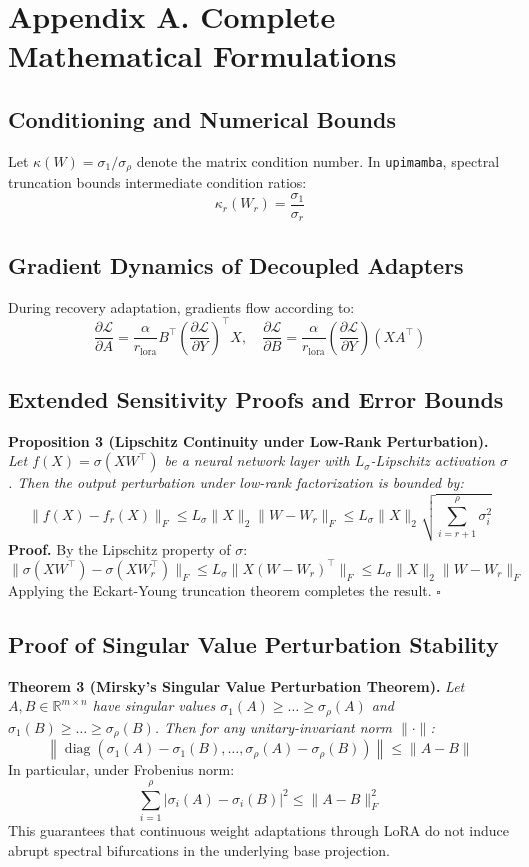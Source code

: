 \section*{Appendix A. Complete Mathematical Formulations}

\subsection*{Conditioning and Numerical Bounds}
Let $\kappa(W) = \sigma_1 / \sigma_\rho$ denote the matrix condition number. In \texttt{upimamba}, spectral truncation bounds intermediate condition ratios:
\[
\kappa_r(W_r) = \frac{\sigma_1}{\sigma_r}
\]

\subsection*{Gradient Dynamics of Decoupled Adapters}
During recovery adaptation, gradients flow according to:
\[
\frac{\partial \mathcal{L}}{\partial A} = \frac{\alpha}{r_{\text{lora}}} B^\top \left( \frac{\partial \mathcal{L}}{\partial Y} \right)^\top X, \quad \frac{\partial \mathcal{L}}{\partial B} = \frac{\alpha}{r_{\text{lora}}} \left( \frac{\partial \mathcal{L}}{\partial Y} \right) (X A^\top)
\]

\subsection*{Extended Sensitivity Proofs and Error Bounds}
\textbf{Proposition 3 (Lipschitz Continuity under Low-Rank Perturbation).} \textit{Let $f(X) = \sigma(X W^\top)$ be a neural network layer with $L_\sigma$-Lipschitz activation $\sigma$. Then the output perturbation under low-rank factorization is bounded by:}
\[
\|f(X) - f_r(X)\|_F \le L_\sigma \|X\|_2 \|W - W_r\|_F \le L_\sigma \|X\|_2 \sqrt{\sum_{i=r+1}^\rho \sigma_i^2}
\]
\textbf{Proof.} By the Lipschitz property of $\sigma$:
\[
\|\sigma(X W^\top) - \sigma(X W_r^\top)\|_F \le L_\sigma \|X (W - W_r)^\top\|_F \le L_\sigma \|X\|_2 \|W - W_r\|_F
\]
Applying the Eckart-Young truncation theorem completes the result. $\square$

\subsection*{Proof of Singular Value Perturbation Stability}
\textbf{Theorem 3 (Mirsky's Singular Value Perturbation Theorem).} \textit{Let $A, B \in \mathbb{R}^{m \times n}$ have singular values $\sigma_1(A) \ge \dots \ge \sigma_\rho(A)$ and $\sigma_1(B) \ge \dots \ge \sigma_\rho(B)$. Then for any unitary-invariant norm $\|\cdot\|$:}
\[
\left\| \operatorname{diag}(\sigma_1(A) - \sigma_1(B), \dots, \sigma_\rho(A) - \sigma_\rho(B)) \right\| \le \|A - B\|
\]
In particular, under Frobenius norm:
\[
\sum_{i=1}^\rho |\sigma_i(A) - \sigma_i(B)|^2 \le \|A - B\|_F^2
\]
This guarantees that continuous weight adaptations through LoRA do not induce abrupt spectral bifurcations in the underlying base projection.

